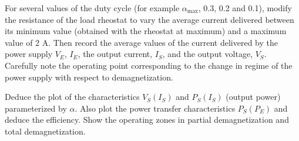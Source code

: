 \begin{enumerate}
{}{
\item For several values of the duty cycle (for example $\alpha_{\max}$, 0.3, 0.2 and 0.1), modify the resistance of the load rheostat to vary the average current delivered between its minimum value (obtained with the rheostat at maximum) and a maximum value of 2 A. Then record the average values of the current delivered by the power supply $V_E$, $I_E$, the output current, $I_S$, and the output voltage, $V_S$. Carefully note the operating point corresponding to the change in regime of the power supply with respect to demagnetization.
\item Deduce the plot of the characteristics $V_S(I_S)$ and $P_S(I_S)$ (output power) parameterized by $\alpha$. Also plot the power transfer characteristics $P_S(P_E)$ and deduce the efficiency. Show the operating zones in partial demagnetization and total demagnetization.
}
\end{enumerate}



\begin{enumerate}

\end{enumerate}
